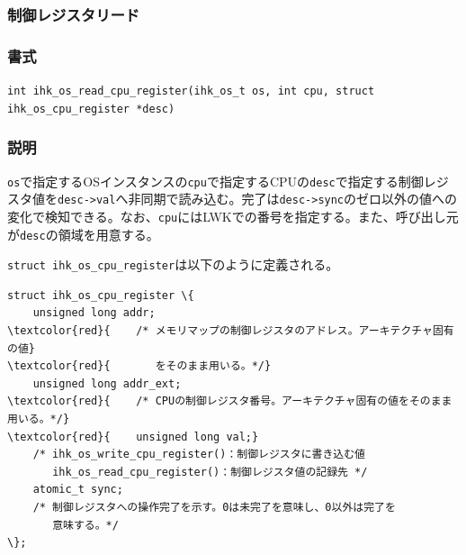 \documentclass[twoside,11pt,fleqn]{book}
\begin{document}
\subsubsection{制御レジスタリード}
\subsubsection*{書式}{\quad} \texttt{int ihk\_os\_read\_cpu\_register(ihk\_os\_t os, int cpu, struct ihk\_os\_cpu\_register *desc)}
\subsubsection*{説明}{\quad}
\texttt{os}で指定するOSインスタンスの\texttt{cpu}で指定するCPUの\texttt{desc}で指定する制御レジスタ値を\texttt{desc->val}へ非同期で読み込む。完了は\texttt{desc->sync}のゼロ以外の値への変化で検知できる。なお、\texttt{cpu}にはLWKでの番号を指定する。また、呼び出し元が\texttt{desc}の領域を用意する。

\texttt{struct ihk\_os\_cpu\_register}は以下のように定義される。
\begin{Verbatim}[commandchars=\\\{\}]
struct ihk_os_cpu_register \{
    unsigned long addr;
\textcolor{red}{    /* メモリマップの制御レジスタのアドレス。アーキテクチャ固有の値}
\textcolor{red}{       をそのまま用いる。*/}
    unsigned long addr_ext;
\textcolor{red}{    /* CPUの制御レジスタ番号。アーキテクチャ固有の値をそのまま用いる。*/}
\textcolor{red}{    unsigned long val;}
    /* ihk_os_write_cpu_register()：制御レジスタに書き込む値
       ihk_os_read_cpu_register()：制御レジスタ値の記録先 */
    atomic_t sync;
    /* 制御レジスタへの操作完了を示す。0は未完了を意味し、0以外は完了を
       意味する。*/
\};
\end{Verbatim}
\end{document}
